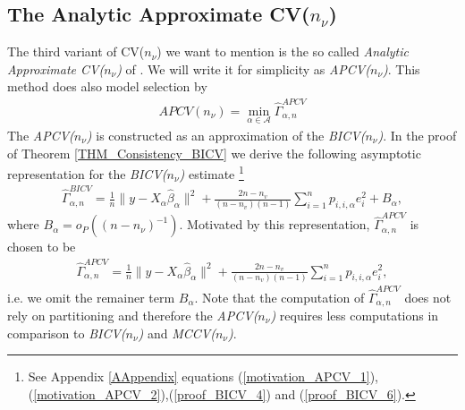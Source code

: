 \documentclass[Research_Module_ES.tex]{subfiles}
\begin{document}
\subsection{The Analytic Approximate CV($n_\nu$)}
The third variant of CV($n_\nu$) we want to mention is the so called \textit{Analytic Approximate CV($n_\nu$)} of \cite{shao}. We will write it for simplicity as \textit{APCV($n_\nu$)}. This method does also model selection by 
\begin{align*}
APCV(n_\nu)=\min_{\alpha\in\mathcal{A}}\hat{\Gamma}_{\alpha,n}^{APCV}
\end{align*}
The \textit{APCV($n_\nu$)} is constructed as an approximation of the \textit{BICV($n_\nu$)}. In the proof of Theorem \ref{THM_Consistency_BICV} we derive the following asymptotic representation for the \textit{BICV($n_\nu$)} estimate
\footnote{See Appendix \ref{AAppendix} equations (\ref{motivation_APCV_1}),(\ref{motivation_APCV_2}),(\ref{proof_BICV_4}) and (\ref{proof_BICV_6}).}
\begin{align*}
\hat{\Gamma}_{\alpha,n}^{BICV}=\frac{1}{n}\lVert y-X_\alpha\hat{\beta}_\alpha\rVert^2 + \frac{2n-n_v}{(n-n_v)(n-1)}\sum_{i=1}^np_{i,i,\alpha}e_i^2 + B_\alpha,
\end{align*}
where $B_\alpha = o_P((n-n_\nu)^{-1})$. 
Motivated by this representation, $\hat{\Gamma}_{\alpha,n}^{APCV}$ is chosen to be
\begin{align*}
\hat{\Gamma}_{\alpha,n}^{APCV}=\frac{1}{n}\lVert y-X_\alpha\hat{\beta}_\alpha\rVert^2 + \frac{2n-n_v}{(n-n_v)(n-1)}\sum_{i=1}^np_{i,i,\alpha}e_i^2,
\end{align*}
i.e. we omit the remainer term $B_\alpha$.
Note that the computation of $\hat{\Gamma}_{\alpha,n}^{APCV}$ does not rely on partitioning and therefore the \textit{APCV($n_\nu$)} requires less computations in comparison to \textit{BICV($n_\nu$)} and \textit{MCCV($n_\nu$)}.
\end{document}

